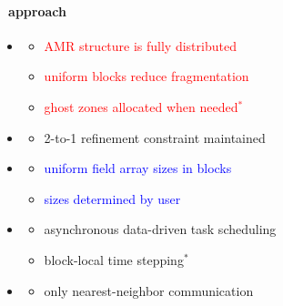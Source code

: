 
\begin{frame}[fragile] 
\secframetitle{\ssApproach}
\framesubtitle{\enzopcello\ approach}
\begin{minipage}{3.0in}
\begin{itemize}
\item {}
\begin{itemize}
  \item<2-> \textcolor{red}{AMR structure is fully distributed}
  \item<2-> \textcolor{red}{uniform blocks reduce fragmentation}
  \item<2-> \textcolor{red}{ghost zones allocated when needed$^*$}
\end{itemize}
\item {}
\begin{itemize}
   \item<3-> \textcolor{green!80!black}{2-to-1 refinement constraint maintained}
\end{itemize}
\item {}
\begin{itemize}
   \item<4-> \textcolor{blue}{uniform field array sizes in blocks}
   \item<4-> \textcolor{blue}{sizes determined by user}
\end{itemize}
\item {}
\begin{itemize}
   \item<5-> \textcolor{cyan!80!black}{asynchronous data-driven task scheduling}
   \item<5-> \textcolor{cyan!80!black}{block-local time stepping$^*$}
\end{itemize}
\item {}
\begin{itemize}
   \item<6-> \textcolor{orange!80!black}{only nearest-neighbor communication}
\end{itemize}

\end{itemize}
\end{minipage}
\end{frame}
